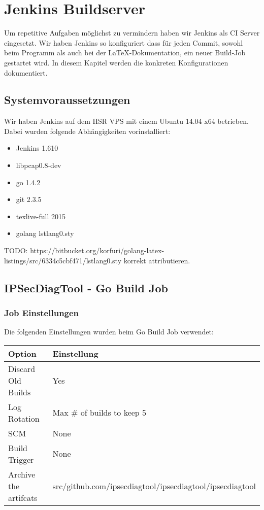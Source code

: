 \chapter{Jenkins Buildserver}
Um repetitive Aufgaben möglichst zu vermindern haben wir Jenkins als \acs{CI} Server eingesetzt. Wir haben Jenkins so konfiguriert dass für jeden Commit, sowohl beim Programm als auch bei der LaTeX-Dokumentation, ein neuer Build-Job gestartet wird.
In diesem Kapitel werden die konkreten Konfigurationen dokumentiert.

\section{Systemvoraussetzungen}
Wir haben Jenkins auf dem HSR VPS mit einem Ubuntu 14.04 x64 betrieben. Dabei wurden folgende Abhängigkeiten vorinstalliert:

\begin{itemize}
  \item Jenkins 1.610
  \item libpcap0.8-dev
  \item go 1.4.2
  \item git 2.3.5
  \item texlive-full 2015
  \item golang lstlang0.sty
\end{itemize}

TODO: https://bitbucket.org/korfuri/golang-latex-listings/src/6334c5cbf471/lstlang0.sty
korrekt attributieren.

\section{IPSecDiagTool - Go Build Job}

\subsection{Job Einstellungen}
Die folgenden Einstellungen wurden beim Go Build Job verwendet:

\begin{table}[h]
\begin{tabular}{|l|l|}
\hline
\rowcolor[HTML]{C0C0C0} 
{\color[HTML]{000000} \textbf{Option}} & {\color[HTML]{000000} \textbf{Einstellung}}              \\ \hline
Discard Old Builds                          & Yes                                                      \\ \hline
Log Rotation                                & Max \# of builds to keep 5                               \\ \hline
SCM                                         & None                                                     \\ \hline
Build Trigger                               & None                                                     \\ \hline
Archive the artifcats                       & src/github.com/ipsecdiagtool/ipsecdiagtool/ipsecdiagtool \\ \hline
\end{tabular}
\end{table}

